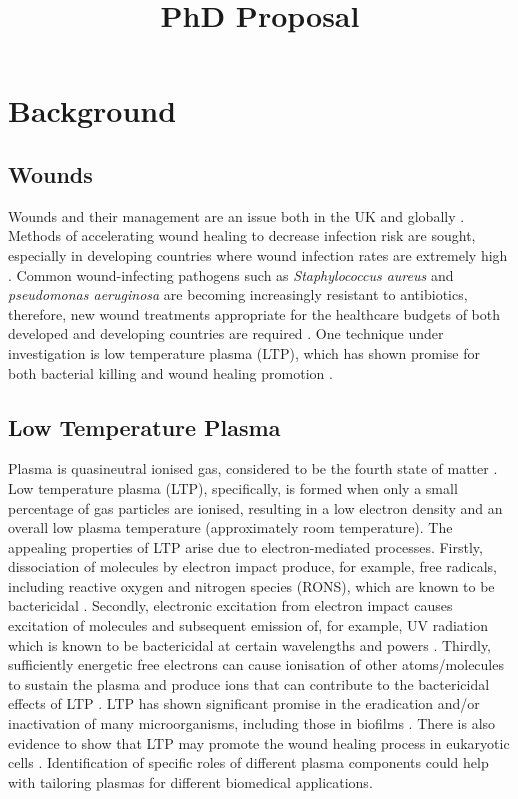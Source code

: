 \documentclass[11pt, oneside]{article}   	%
\title{PhD Proposal}
\date{}							%
\begin{document}
\maketitle
\section*{Background}
\subsection*{Wounds}

Wounds and their management are an issue both in the UK and globally \cite{Posnett2008burden}.
Methods of accelerating wound healing to decrease infection risk are sought, especially in developing countries where wound infection rates are extremely high \cite{Kihla2014risk}. 
Common wound-infecting pathogens such as \textit{Staphylococcus aureus} and \textit{pseudomonas aeruginosa} \cite{Church2006burn, Bowler2001wound} are becoming increasingly resistant to antibiotics, therefore, new wound treatments appropriate for the healthcare budgets of both developed and developing countries are required \cite{Chambers2009waves, Godebo2013multidrug, Howell2005a}.
One technique under investigation is low temperature plasma (LTP), which has shown promise for both bacterial killing and wound healing promotion \cite{Kong2009plasma, Kramer2013suitability, Isbary2012successful, Isbary2010a}.


\subsection*{Low Temperature Plasma}

Plasma is quasineutral ionised gas, considered to be the fourth state of matter \cite{Fridman2013plasmamedicine}.
Low temperature plasma (LTP), specifically, is formed when only a small percentage of gas particles are ionised, resulting in a low electron density and an overall low plasma temperature (approximately room temperature).
The appealing properties of LTP arise due to electron-mediated processes.
Firstly, dissociation of molecules by electron impact produce, for example, free radicals, including reactive oxygen and nitrogen species (RONS), which are known to be bactericidal \cite{Kong2009plasma}.
Secondly, electronic excitation from electron impact causes excitation of molecules and subsequent emission of, for example, UV radiation which is known to be bactericidal at certain wavelengths and powers \cite{Laroussi2004evaluation}.
Thirdly, sufficiently energetic free electrons can cause ionisation of other atoms/molecules to sustain the plasma and produce ions that can contribute to the bactericidal effects of LTP \cite{Mendis2000a, Laroussi2002nonthermal}.
LTP has shown significant promise in the eradication and/or inactivation of many microorganisms, including those in biofilms \cite{Laroussi2005low}. 
There is also evidence to show that LTP may promote the wound healing process in eukaryotic cells \cite{Haertel2014nonthermal, Kramer2013suitability}.
Identification of specific roles of different plasma components could help with tailoring plasmas for different biomedical applications.
\end{document}
